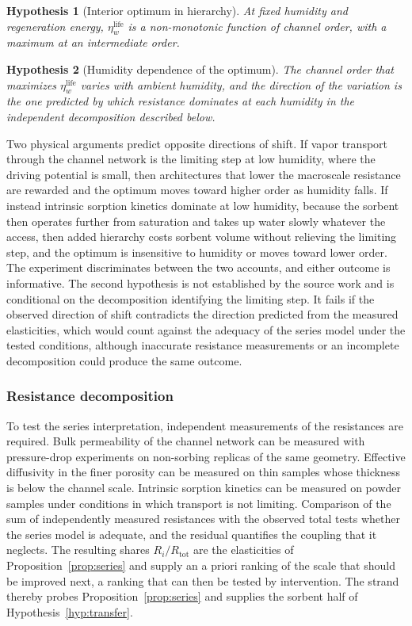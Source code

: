 \documentclass[11pt]{article}
\newtheorem{hypothesis}{Hypothesis}
\theoremstyle{definition}
\begin{document}
\begin{hypothesis}[Interior optimum in hierarchy]
\label{hyp:interior}
At fixed humidity and regeneration energy, $\eta_w^{\mathrm{life}}$ is a non-monotonic function of channel order, with a maximum at an intermediate order.
\end{hypothesis}

\begin{hypothesis}[Humidity dependence of the optimum]
\label{hyp:humidity}
The channel order that maximizes $\eta_w^{\mathrm{life}}$ varies with ambient humidity, and the direction of the variation is the one predicted by which resistance dominates at each humidity in the independent decomposition described below.
\end{hypothesis}

Two physical arguments predict opposite directions of shift. If vapor transport through the channel network is the limiting step at low humidity, where the driving potential is small, then architectures that lower the macroscale resistance are rewarded and the optimum moves toward higher order as humidity falls. If instead intrinsic sorption kinetics dominate at low humidity, because the sorbent then operates further from saturation and takes up water slowly whatever the access, then added hierarchy costs sorbent volume without relieving the limiting step, and the optimum is insensitive to humidity or moves toward lower order. The experiment discriminates between the two accounts, and either outcome is informative. The second hypothesis is not established by the source work and is conditional on the decomposition identifying the limiting step. It fails if the observed direction of shift contradicts the direction predicted from the measured elasticities, which would count against the adequacy of the series model under the tested conditions, although inaccurate resistance measurements or an incomplete decomposition could produce the same outcome.

\subsubsection*{Resistance decomposition}

To test the series interpretation, independent measurements of the resistances are required. Bulk permeability of the channel network can be measured with pressure-drop experiments on non-sorbing replicas of the same geometry. Effective diffusivity in the finer porosity can be measured on thin samples whose thickness is below the channel scale. Intrinsic sorption kinetics can be measured on powder samples under conditions in which transport is not limiting. Comparison of the sum of independently measured resistances with the observed total tests whether the series model is adequate, and the residual quantifies the coupling that it neglects. The resulting shares $R_i/R_{\mathrm{tot}}$ are the elasticities of Proposition~\ref{prop:series} and supply an a priori ranking of the scale that should be improved next, a ranking that can then be tested by intervention. The strand thereby probes Proposition~\ref{prop:series} and supplies the sorbent half of Hypothesis~\ref{hyp:transfer}.
\end{document}
